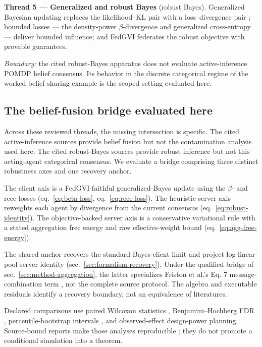 \documentclass[
  english,
]{article}
\theoremstyle{plain}
\theoremstyle{definition}
\theoremstyle{remark}
\theoremstyle{definition}
\begin{document}
\textbf{Thread 5 --- Generalized and robust Bayes} (robust Bayes).
Generalized Bayesian updating replaces the likelihood--KL pair with a
loss--divergence pair
\citep{bissiri2016general, knoblauch2022generalized}; bounded losses ---
the density-power \(\beta\)-divergence \citep{basu1998robust} and
generalized cross-entropy \citep{zhang2018generalized} --- deliver
bounded influence; and FedGVI \citep{mildner2025fedgvi} federates the
robust objective with provable guarantees.

\emph{Boundary:} the cited robust-Bayes apparatus does not evaluate
active-inference POMDP belief consensus. Its behavior in the discrete
categorical regime of the worked belief-sharing example
\citep{friston2024federated} is the scoped setting evaluated here.

\subsection{The belief-fusion bridge evaluated
here}\label{sec:gap-bridge}

Across these reviewed threads, the missing intersection is specific. The
cited active-inference sources provide belief fusion but not the
contamination analysis used here. The cited robust-Bayes sources provide
robust inference but not this acting-agent categorical consensus. We
evaluate a bridge comprising three distinct robustness axes and one
recovery anchor.

The client axis is a FedGVI-faithful generalized-Bayes update using the
\(\beta\)- and rcce-losses (eq.~\ref{eq:beta-loss},
eq.~\ref{eq:rcce-loss}). The heuristic server axis reweights each agent
by divergence from the current consensus (eq.~\ref{eq:robust-identity}).
The objective-backed server axis is a conservative variational rule with
a stated aggregation free energy and raw effective-weight bound
(eq.~\ref{eq:agg-free-energy}).

The shared anchor recovers the standard-Bayes client limit and project
log-linear-pool server identity (sec.~\ref{sec:formalism-recovery}).
Under the qualified bridge of sec.~\ref{sec:method-aggregation}, the
latter specializes Friston et al.'s Eq. 7 message-combination term
\citep{friston2024federated}, not the complete source protocol. The
algebra and executable residuals identify a recovery boundary, not an
equivalence of literatures.

Declared comparisons use paired Wilcoxon statistics
\citep{wilcoxon1945individual}, Benjamini--Hochberg FDR
\citep{benjamini1995controlling}, percentile-bootstrap intervals
\citep{efron1993bootstrap}, and observed-effect design-power planning.
Source-bound reports make those analyses reproducible
\citep{peng2011reproducible}; they do not promote a conditional
simulation into a theorem.
\end{document}
